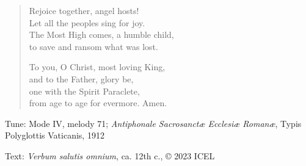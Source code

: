 \hymn



\setlength{\vleftmargin}{2em}
\begin{verse}
Rejoice together, angel hosts!\\
Let all the peoples sing for joy.\\
The Most High comes, a humble child,\\
to save and ransom what was lost.

To you, O Christ, most loving King,\\
and to the Father, glory be,\\
one with the Spirit Paraclete,\\
from age to age for evermore. Amen.
\end{verse}
\setlength{\vleftmargin}{\defleftmargini}

\begin{hymnsource}
Tune: Mode IV, melody 71; \emph{Antiphonale Sacrosanctæ Ecclesiæ Romanæ}, Typis Polyglottis Vaticanis, 1912

Text: \emph{Verbum salutis omnium}, ca. 12th c., © 2023 ICEL
\end{hymnsource}
